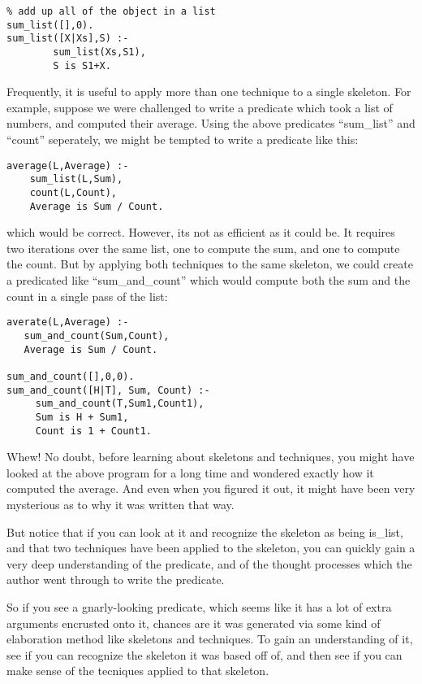 \documentclass{book}[9pt]
\begin{document}
\begin{verbatim}
% add up all of the object in a list
sum_list([],0).
sum_list([X|Xs],S) :-
        sum_list(Xs,S1),
        S is S1+X.
\end{verbatim}

Frequently, it is useful to apply more than one technique to a
single skeleton.  For example, suppose we were challenged to write
a predicate which took a list of numbers, and computed their average.
Using the above predicates ``sum\_list'' and ``count'' seperately, we
might be tempted to write a predicate like this:
\begin{verbatim}
average(L,Average) :-
    sum_list(L,Sum),
    count(L,Count),
    Average is Sum / Count.
\end{verbatim}
\noindent which would be correct.  However, its not as efficient
as it could be.  It requires two iterations over the same list, one
to compute the sum, and one to compute the count.  But by applying 
both techniques to the same skeleton, we could create a predicated
like ``sum\_and\_count'' which would compute both the sum and the count
in a single pass of the list:
\begin{verbatim}
averate(L,Average) :-
   sum_and_count(Sum,Count),
   Average is Sum / Count.

sum_and_count([],0,0).
sum_and_count([H|T], Sum, Count) :-
     sum_and_count(T,Sum1,Count1),
     Sum is H + Sum1,
     Count is 1 + Count1.
\end{verbatim}
\noindent Whew!  No doubt, before learning about skeletons and
techniques, you might have looked at the above program for a long time
and wondered exactly how it computed the average.  And even when you
figured it out, it might have been very mysterious as to why it was
written that way.

But notice that if you can look at it and recognize the skeleton as
being is\_list, and that two techniques have been applied to the
skeleton, you can quickly gain a very deep understanding of the
predicate, and of the thought processes which the author went through
to write the predicate.

So if you see a gnarly-looking predicate, which seems like it has a
lot of extra arguments encrusted onto it, chances are it was generated
via some kind of elaboration method like skeletons and techniques.  To
gain an understanding of it, see if you can recognize the skeleton it
was based off of, and then see if you can make sense of the tecniques
applied to that skeleton.  
\end{document}
